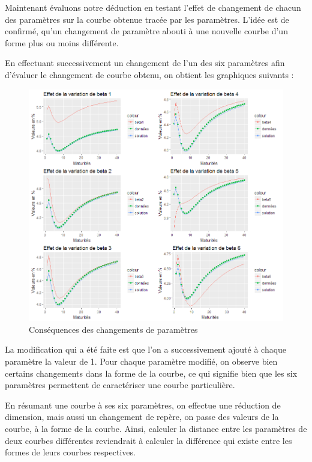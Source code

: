Maintenant évaluons notre déduction en testant l'effet de changement de chacun des paramètres sur la courbe obtenue tracée par les paramètres. L'idée est de confirmé, qu'un changement de paramètre abouti à une nouvelle courbe d'un forme plus ou moins différente.

En effectuant successivement un changement de l'un des six paramètres afin d'évaluer le changement de courbe obtenu, on obtient les graphiques suivants :

\begin{figure}[H]
\centering
\caption{Conséquences des changements de paramètres}
   \includegraphics[scale=0.7]{img/betas.png}
\end{figure}

La modification qui a été faite est que l'on a successivement ajouté à chaque paramètre la valeur de 1.
Pour chaque paramètre modifié, on observe bien certains changements dans la forme de la courbe, ce qui signifie bien que les six paramètres permettent de caractériser une courbe particulière.

En résumant une courbe à ses six paramètres, on effectue une réduction de dimension, mais aussi un changement de repère, on passe des valeurs de la courbe, à la forme de la courbe. Ainsi, calculer la distance entre les paramètres de deux courbes différentes reviendrait à calculer la différence qui existe entre les formes de leurs courbes respectives.


